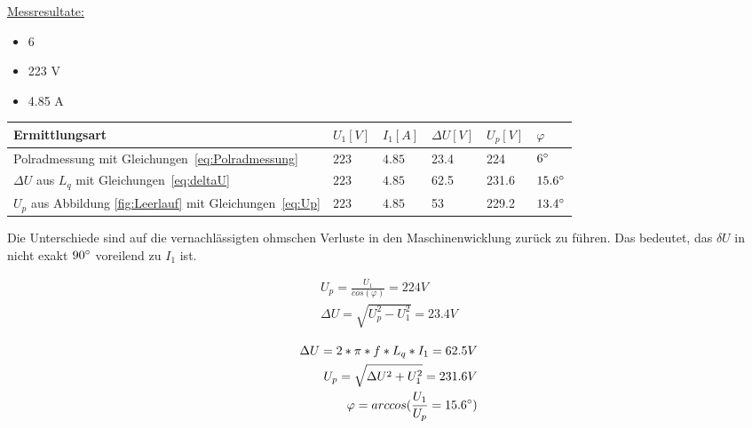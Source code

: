 \begin{flushleft}
\underline{Messresultate:}\\
\vspace{0.3cm}


\begin{itemize}
\item {}            6\degree
\item {}            223 V
\item {}            4.85 A
\end{itemize}

\vspace{0.5cm}

\begin{tabular}{|l|l|l|l|l|l|}
 \hline
 \rowcolor[gray]{.8} \textbf{Ermittlungsart} & \textbf{$U_1 [V]$}&   \textbf{$I_1 [A]$} &\textbf{$\Delta U [V]$} & \textbf{$U_p [V]$} & \textbf{$\varphi$}\\
 \hline
 Polradmessung mit Gleichungen~\ref{eq:Polradmessung}& $223$ & $4.85$ & 23.4& 224& $6\degree$ \\
\hline
 $\Delta U$ aus $L_q$ mit Gleichungen~\ref{eq:deltaU} & $223$ & $4.85$ & 62.5& 231.6& $15.6\degree$ \\
\hline
 $U_p$ aus Abbildung \ref{fig:Leerlauf} mit Gleichungen~\ref{eq:Up} & $223$ & $4.85$ & 53& 229.2&  $13.4\degree$\\
\hline
\end{tabular}

Die Unterschiede sind auf die vernachlässigten ohmschen Verluste in den Maschinenwicklung zurück zu führen. Das bedeutet, das $\delta U$ in nicht exakt $90\degree$ voreilend zu $I_1$ ist.

\begin{equation} \label{eq:Polradmessung}
\begin{aligned}
 U_p = \frac{U_1}{cos(\varphi)} = 224 V \\
 \Delta U = \sqrt{U_p^2-U_1^2} = 23.4 V 
\end{aligned}
\end{equation} 

\begin{equation} \label{eq:deltaU}
\begin{aligned} 
	\Delta U = 2*\pi*f*L_q*I_1 = 62.5 V \\
	U_p = \sqrt{\Delta U^2+U_1^2} = 231.6 V \\
	\varphi = arccos(\frac{U_1}{U_p} = 15.6\degree)
\end{aligned}
\end{equation} 


\end{flushleft}
